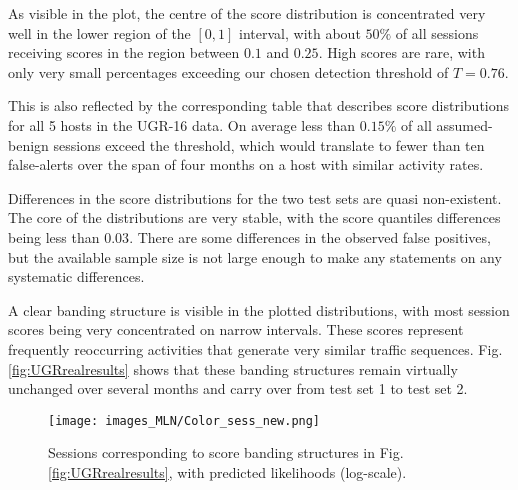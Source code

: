 


As visible in the plot, the centre of the score distribution is concentrated very well in the lower region of the $[0,1]$ interval, with about $50\%$ of all sessions receiving scores in the region between $0.1$ and $0.25$. High scores are rare, with only very small percentages exceeding our chosen detection threshold of $T=0.76$.



This is also reflected by the corresponding table that describes score distributions for all 5 hosts in the UGR-16 data. On average less than $0.15\%$ of all assumed-benign sessions exceed the threshold, which would translate to fewer than ten false-alerts over the span of four months on a host with similar activity rates. 

Differences in the score distributions for the two test sets are quasi non-existent. The core of the distributions are very stable, with the score quantiles differences being less than $0.03$.
There are some differences in the observed false positives, but the available sample size is not large enough to make any statements on any systematic differences.

A clear banding structure is visible in the plotted distributions, with most session scores being very concentrated on narrow intervals. These scores represent frequently reoccurring activities that generate very similar traffic sequences. %
Fig. \ref{fig:UGRrealresults} shows that these banding structures remain virtually unchanged over several months and carry over from test set 1 to test set 2. 


\begin{figure}
\centering
\texttt{[image: images\_MLN/Color\_sess\_new.png]} 
\caption{Sessions corresponding to score banding structures in Fig. \ref{fig:UGRrealresults}, with predicted likelihoods (log-scale).}\label{fig:colsess}
\end{figure}


